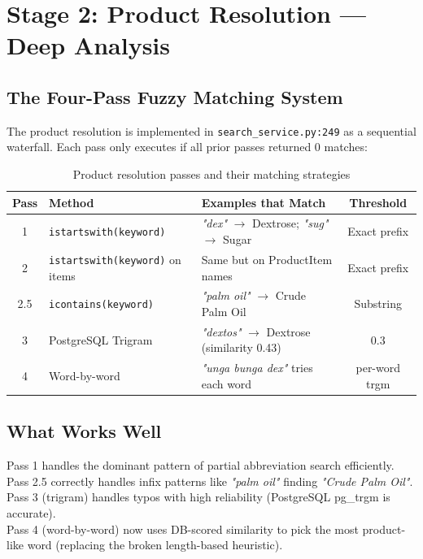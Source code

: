 \documentclass[12pt,a4paper]{article}
\begin{document}
\section{Stage 2: Product Resolution --- Deep Analysis}

\subsection{The Four-Pass Fuzzy Matching System}

The product resolution is implemented in \texttt{search\_service.py:249} as a sequential
waterfall. Each pass only executes if all prior passes returned 0 matches:

\begin{table}[H]
\centering
\renewcommand{\arraystretch}{1.3}
\begin{tabularx}{\textwidth}{clXc}
\toprule
\textbf{Pass} & \textbf{Method} & \textbf{Examples that Match} & \textbf{Threshold} \\
\midrule
1 & \texttt{istartswith(keyword)} & \textit{"dex"} $\to$ Dextrose; \textit{"sug"} $\to$ Sugar & Exact prefix \\
2 & \texttt{istartswith(keyword)} on items & Same but on ProductItem names & Exact prefix \\
2.5 & \texttt{icontains(keyword)} & \textit{"palm oil"} $\to$ Crude Palm Oil & Substring \\
3 & PostgreSQL Trigram & \textit{"dextos"} $\to$ Dextrose (similarity 0.43) & 0.3 \\
4 & Word-by-word & \textit{"unga bunga dex"} tries each word & per-word trgm \\
\bottomrule
\end{tabularx}
\caption{Product resolution passes and their matching strategies}
\end{table}

\subsection{What Works Well}

\begin{okBox}
Pass 1 handles the dominant pattern of partial abbreviation search efficiently. \\
Pass 2.5 correctly handles infix patterns like \textit{"palm oil"} finding \textit{"Crude Palm Oil"}. \\
Pass 3 (trigram) handles typos with high reliability (PostgreSQL pg\_trgm is accurate). \\
Pass 4 (word-by-word) now uses DB-scored similarity to pick the most product-like word
(replacing the broken length-based heuristic).
\end{okBox}
\end{document}
